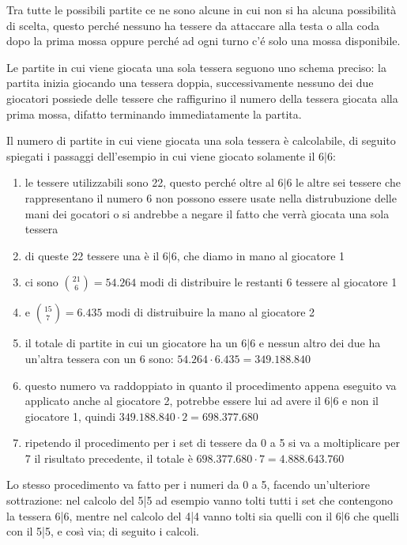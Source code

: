 \documentclass[a4paper,12pt]{report}
\begin{document}
Tra tutte le possibili partite ce ne sono alcune in cui non si ha alcuna possibilità di scelta, questo perché nessuno ha tessere da attaccare alla testa o alla coda dopo la prima mossa oppure perché ad ogni turno c'é solo una mossa disponibile.

Le partite in cui viene giocata una sola tessera seguono uno schema preciso: la partita inizia giocando una tessera doppia, successivamente nessuno dei due giocatori possiede delle tessere che raffigurino il numero della tessera giocata alla prima mossa, difatto terminando immediatamente la partita.

Il numero di partite in cui viene giocata una sola tessera è calcolabile, di seguito spiegati i passaggi dell'esempio in cui viene giocato solamente il \(6|6\):

\begin{enumerate}
    \item le tessere utilizzabili sono 22, questo perché oltre al \(6|6\) le altre sei tessere che rappresentano il numero 6 non possono essere usate nella distrubuzione delle mani dei gocatori o si andrebbe a negare il fatto che verrà giocata una sola tessera 
    \item di queste 22 tessere una è il \(6|6\), che diamo in mano al giocatore 1
    \item ci sono \(\binom{21}{6} = 54.264\) modi di distribuire le restanti 6 tessere al giocatore 1
    \item e \(\binom{15}{7} = 6.435\) modi di distruibuire la mano al giocatore 2
    \item il totale di partite in cui un giocatore ha un \(6|6\) e nessun altro dei due ha un'altra tessera con un 6 sono: \(54.264 \cdot 6.435 = 349.188.840\)
    \item questo numero va raddoppiato in quanto il procedimento appena eseguito va applicato anche al giocatore 2, potrebbe essere lui ad avere il \(6|6\) e non il giocatore 1, quindi \(349.188.840 \cdot 2 = 698.377.680\)
    \item ripetendo il procedimento per i set di tessere da 0 a 5 si va a moltiplicare per 7 il risultato precedente, il totale è \(698.377.680 \cdot 7 = 4.888.643.760\)
\end{enumerate}

Lo stesso procedimento va fatto per i numeri da 0 a 5, facendo un'ulteriore sottrazione: nel calcolo del 5|5 ad esempio vanno tolti tutti i set che contengono la tessera 6|6, mentre nel calcolo del 4|4 vanno tolti sia quelli con il 6|6 che quelli con il 5|5, e così via; di seguito i calcoli.
\end{document}
